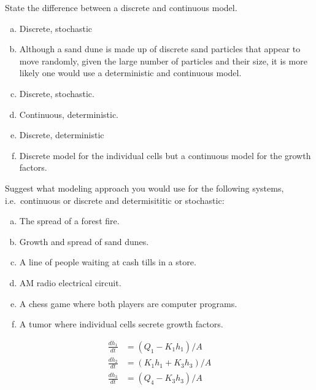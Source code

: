 \documentclass[12pt]{article}
\begin{document}
\begin{question}
State the difference between a discrete and continuous model.
\end{question}
\begin{solution}
\begin{enumerate}[a)]
  \item Discrete, stochastic
  \item Although a sand dune is made up of discrete sand particles that appear to move randomly, given the large number of particles and their size, it is more likely one would use a deterministic and continuous model.
  \item Discrete, stochastic.
  \item Continuous, deterministic.
  \item Discrete, deterministic
  \item Discrete model for the individual cells but a continuous model for the growth factors.
\end{enumerate}
\end{solution}



\begin{question}
Suggest what modeling approach you would use for the following systems, i.e.\ continuous or discrete and determisititic or stochastic:
\begin{enumerate}[a)]
\item The spread of a forest fire.
\item Growth and spread of sand dunes.
\item A line of people waiting at cash tills in a store.
\item AM radio electrical circuit.
\item A chess game where both players are computer programs.
\item A tumor where individual cells secrete growth factors.
\end{enumerate}
\end{question}
\begin{solution}
\begin{align*}
\frac{dh_1}{dt} &= (Q_1 - K_1 h_1)/A \\
\frac{dh_2}{dt} &= (K_1 h_1 + K_3 h_3)/A \\
\frac{dh_3}{dt} &= (Q_4 - K_3 h_3)/A
\end{align*}
\end{solution}
\end{document}
